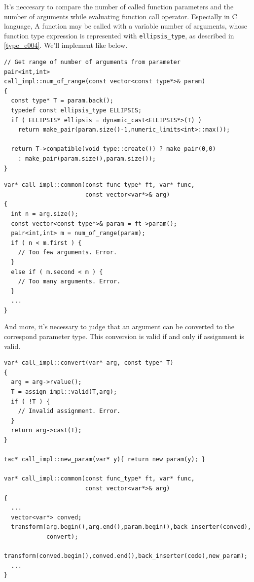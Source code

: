 It's neccesary to compare
the number of called function parameters and
the number of arguments while evaluating function call operator.
Especially in C language, 
A function may be called with a variable number of arguments,
whose function type expression is represented with {\tt{ellipsis\_type}},
as described in \ref{type_e004}. We'll implement like below.
\begin{verbatim}
// Get range of number of arguments from parameter
pair<int,int>
call_impl::num_of_range(const vector<const type*>& param)
{
  const type* T = param.back();
  typedef const ellipsis_type ELLIPSIS;
  if ( ELLIPSIS* ellipsis = dynamic_cast<ELLIPSIS*>(T) )
    return make_pair(param.size()-1,numeric_limits<int>::max());

  return T->compatible(void_type::create()) ? make_pair(0,0)
    : make_pair(param.size(),param.size());
}
\end{verbatim}

\begin{verbatim}
var* call_impl::common(const func_type* ft, var* func,
                       const vector<var*>& arg)
{
  int n = arg.size();
  const vector<const type*>& param = ft->param();
  pair<int,int> m = num_of_range(param);
  if ( n < m.first ) {
    // Too few arguments. Error.
  }
  else if ( m.second < m ) {
    // Too many arguments. Error.
  } 
  ...
}
\end{verbatim}

And more, it's necessary to judge that an argument
can be converted to the correspond parameter type.
This conversion is valid if and only if assignment is valid.
\begin{verbatim}
var* call_impl::convert(var* arg, const type* T)
{
  arg = arg->rvalue();
  T = assign_impl::valid(T,arg);
  if ( !T ) {
    // Invalid assignment. Error.
  }
  return arg->cast(T);
}

tac* call_impl::new_param(var* y){ return new param(y); }

var* call_impl::common(const func_type* ft, var* func,
                       const vector<var*>& arg)
{
  ...
  vector<var*> conved;
  transform(arg.begin(),arg.end(),param.begin(),back_inserter(conved),
            convert);
  transform(conved.begin(),conved.end(),back_inserter(code),new_param);
  ...
}
\end{verbatim}

